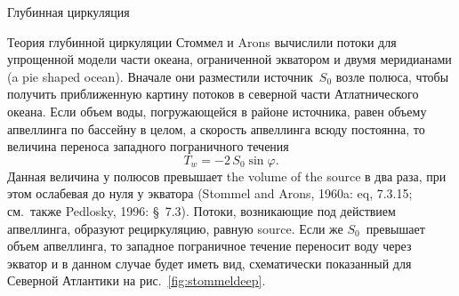 \begin{chapter}{Глубинная циркуляция}
\begin{section}{Теория глубинной циркуляции}
Стоммел и Arons вычислили потоки для упрощенной модели части океана, 
ограниченной экватором и двумя меридианами (a pie shaped ocean). 
Вначале они разместили источник~$S_0$ возле полюса, чтобы получить
приближенную картину потоков в северной части Атлатнического океана.
Если объем воды, погружающейся в районе источника, равен объему апвеллинга
по бассейну в целом, а скорость апвеллинга всюду постоянна, то величина
переноса западного
пограничного течения
\begin{equation}
 T_w = -2\,S_0 \sin \varphi.
\end{equation}
Данная величина у полюсов превышает the volume of the source в два раза, 
при этом ослабевая до нуля у экватора (Stommel and Arons, 1960a: eq, 7.3.15; 
см.\ также Pedlosky, 1996: \S~7.3). Потоки, возникающие под действием
апвеллинга, образуют рециркуляцию,
равную source. Если же $S_0$~превышает объем апвеллинга, то западное 
пограничное течение переносит воду через экватор и в данном случае будет
иметь вид, схематически показанный для Северной Атлантики на 
рис.~\ref{fig:stommeldeep}.
%


\end{section}
\end{chapter}
